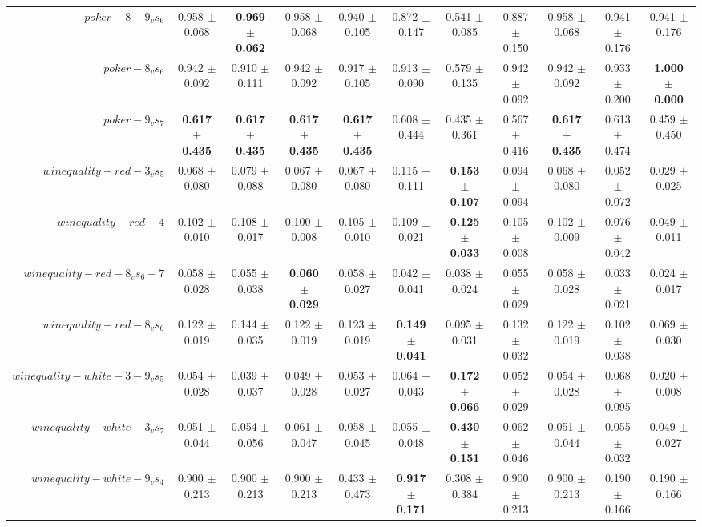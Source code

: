 \begin{table}[!ht]
{\begin{tabular}{r c c c c c c c c c c}
$poker-8-9_vs_6$ & 0.958 $\pm$ 0.068 & \textbf{0.969 $\pm$ 0.062} & 0.958 $\pm$ 0.068 & 0.940 $\pm$ 0.105 & 0.872 $\pm$ 0.147 & 0.541 $\pm$ 0.085 & 0.887 $\pm$ 0.150 & 0.958 $\pm$ 0.068 & 0.941 $\pm$ 0.176 & 0.941 $\pm$ 0.176 \\
$poker-8_vs_6$ & 0.942 $\pm$ 0.092 & 0.910 $\pm$ 0.111 & 0.942 $\pm$ 0.092 & 0.917 $\pm$ 0.105 & 0.913 $\pm$ 0.090 & 0.579 $\pm$ 0.135 & 0.942 $\pm$ 0.092 & 0.942 $\pm$ 0.092 & 0.933 $\pm$ 0.200 & \textbf{1.000 $\pm$ 0.000} \\
$poker-9_vs_7$ & \textbf{0.617 $\pm$ 0.435} & \textbf{0.617 $\pm$ 0.435} & \textbf{0.617 $\pm$ 0.435} & \textbf{0.617 $\pm$ 0.435} & 0.608 $\pm$ 0.444 & 0.435 $\pm$ 0.361 & 0.567 $\pm$ 0.416 & \textbf{0.617 $\pm$ 0.435} & 0.613 $\pm$ 0.474 & 0.459 $\pm$ 0.450 \\
$winequality-red-3_vs_5$ & 0.068 $\pm$ 0.080 & 0.079 $\pm$ 0.088 & 0.067 $\pm$ 0.080 & 0.067 $\pm$ 0.080 & 0.115 $\pm$ 0.111 & \textbf{0.153 $\pm$ 0.107} & 0.094 $\pm$ 0.094 & 0.068 $\pm$ 0.080 & 0.052 $\pm$ 0.072 & 0.029 $\pm$ 0.025 \\
$winequality-red-4$ & 0.102 $\pm$ 0.010 & 0.108 $\pm$ 0.017 & 0.100 $\pm$ 0.008 & 0.105 $\pm$ 0.010 & 0.109 $\pm$ 0.021 & \textbf{0.125 $\pm$ 0.033} & 0.105 $\pm$ 0.008 & 0.102 $\pm$ 0.009 & 0.076 $\pm$ 0.042 & 0.049 $\pm$ 0.011 \\
$winequality-red-8_vs_6-7$ & 0.058 $\pm$ 0.028 & 0.055 $\pm$ 0.038 & \textbf{0.060 $\pm$ 0.029} & 0.058 $\pm$ 0.027 & 0.042 $\pm$ 0.041 & 0.038 $\pm$ 0.024 & 0.055 $\pm$ 0.029 & 0.058 $\pm$ 0.028 & 0.033 $\pm$ 0.021 & 0.024 $\pm$ 0.017 \\
$winequality-red-8_vs_6$ & 0.122 $\pm$ 0.019 & 0.144 $\pm$ 0.035 & 0.122 $\pm$ 0.019 & 0.123 $\pm$ 0.019 & \textbf{0.149 $\pm$ 0.041} & 0.095 $\pm$ 0.031 & 0.132 $\pm$ 0.032 & 0.122 $\pm$ 0.019 & 0.102 $\pm$ 0.038 & 0.069 $\pm$ 0.030 \\
$winequality-white-3-9_vs_5$ & 0.054 $\pm$ 0.028 & 0.039 $\pm$ 0.037 & 0.049 $\pm$ 0.028 & 0.053 $\pm$ 0.027 & 0.064 $\pm$ 0.043 & \textbf{0.172 $\pm$ 0.066} & 0.052 $\pm$ 0.029 & 0.054 $\pm$ 0.028 & 0.068 $\pm$ 0.095 & 0.020 $\pm$ 0.008 \\
$winequality-white-3_vs_7$ & 0.051 $\pm$ 0.044 & 0.054 $\pm$ 0.056 & 0.061 $\pm$ 0.047 & 0.058 $\pm$ 0.045 & 0.055 $\pm$ 0.048 & \textbf{0.430 $\pm$ 0.151} & 0.062 $\pm$ 0.046 & 0.051 $\pm$ 0.044 & 0.055 $\pm$ 0.032 & 0.049 $\pm$ 0.027 \\
$winequality-white-9_vs_4$ & 0.900 $\pm$ 0.213 & 0.900 $\pm$ 0.213 & 0.900 $\pm$ 0.213 & 0.433 $\pm$ 0.473 & \textbf{0.917 $\pm$ 0.171} & 0.308 $\pm$ 0.384 & 0.900 $\pm$ 0.213 & 0.900 $\pm$ 0.213 & 0.190 $\pm$ 0.166 & 0.190 $\pm$ 0.166 \\

\end{tabular}}
\end{table}
